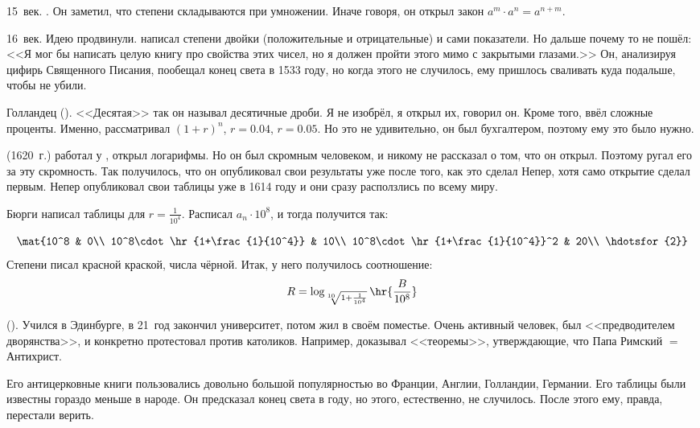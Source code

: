 \documentclass[a4paper,oneside,fleqn,10pt]{article}
\begin{document}
15~век. . Он заметил, что степени складываются при умножении.
Иначе говоря, он открыл закон $a^m \cdot a^n = a^{n+m}$.

16~век. Идею продвинули.  написал степени двойки (положительные и отрицательные)
и сами показатели. Но дальше почему то не пошёл: <<Я мог бы написать целую книгу про свойства этих чисел,
но я должен пройти этого мимо с закрытыми глазами.>> Он, анализируя цифирь Священного Писания,
пообещал конец света в 1533 году, но когда этого не случилось, ему пришлось сваливать куда
подальше, чтобы не убили.

Голландец  (). <<Десятая>> так он называл
десятичные дроби. Я не изобрёл,
я открыл их, говорил он. Кроме того, ввёл сложные проценты. Именно,
рассматривал $(1+r)^n$, $r = 0.04$, $r = 0.05$.
Но это не удивительно, он был бухгалтером, поэтому ему это было нужно.

 (1620~г.) работал у , открыл логарифмы. Но он был скромным человеком,
и никому не рассказал о том, что он открыл. Поэтому  ругал его за эту скромность.
Так получилось, что он опубликовал свои результаты уже после того, как это сделал Непер,
хотя само открытие сделал первым.
Непер опубликовал свои таблицы уже в 1614 году и они сразу расползлись по всему миру.

Бюрги написал таблицы для $r = \frac{1}{10^4}$. Расписал $a_n\cdot 10^8$,
и тогда получится так:

$$\mat{10^8 & 0\\
10^8\cdot\hr{1+\frac{1}{10^4}} & 10\\
10^8\cdot\hr{1+\frac{1}{10^4}}^2 & 20\\
\hdotsfor{2}}$$
Степени писал красной краской, числа чёрной.
Итак, у него получилось соотношение:
$$R = \log_{\sqrt[10]{1+\frac{1}{10^4}}} \hr{\frac{B}{10^8}}$$

 ().
Учился в Эдинбурге, в 21~год закончил университет, потом жил в своём поместье.
Очень активный человек, был <<предводителем дворянства>>, и конкретно протестовал
против католиков. Например, доказывал <<теоремы>>, утверждающие, что Папа Римский $=$ Антихрист.

Его антицерковные книги пользовались довольно большой популярностью во Франции, Англии, Голландии, Германии.
Его таблицы были известны гораздо меньше в народе.
Он предсказал конец света в  году, но этого, естественно, не случилось.
После этого ему, правда, перестали верить.
\end{document}
